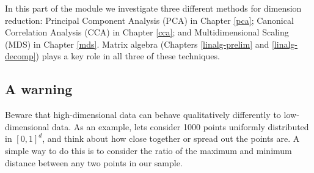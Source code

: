 \documentclass[]{book}
\theoremstyle{definition}
\theoremstyle{definition}
\theoremstyle{definition}
\theoremstyle{remark}
\begin{document}
In this part of the module we investigate three different methods for dimension reduction: Principal Component Analysis (PCA) in Chapter \ref{pca}; Canonical Correlation Analysis (CCA) in Chapter \ref{cca}; and Multidimensional Scaling (MDS) in Chapter \ref{mds}. Matrix algebra (Chapters \ref{linalg-prelim} and \ref{linalg-decomp}) plays a key role in all three of these techniques.

\hypertarget{a-warning}{%
\subsection*{A warning}\label{a-warning}}

Beware that high-dimensional data can behave qualitatively differently to low-dimensional data. As an example, lets consider 1000 points uniformly distributed in \([0,1]^d\), and think about how close together or spread out the points are. A simple way to do this is to consider the ratio of the maximum and minimum distance between any two points in our sample.
\end{document}
